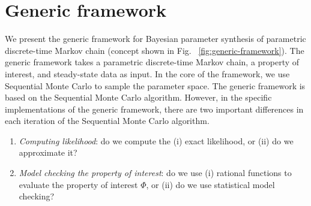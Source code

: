 \section{Generic framework}
We present the generic framework for Bayesian parameter synthesis of parametric discrete-time Markov
chain (concept shown in Fig. ~\ref{fig:generic-framework}). The generic framework takes a
parametric discrete-time Markov chain, a property of interest, and steady-state data as input. In
the core of the framework, we use Sequential Monte Carlo to sample the parameter space. The generic
framework is based on the Sequential Monte Carlo algorithm. However, in the specific implementations
of the generic framework, there are two important differences in each iteration of the Sequential
Monte Carlo algorithm.
\begin{enumerate}
    \item \textit{Computing likelihood}: do we compute the (i) exact likelihood, or (ii) do we
          approximate it?
    \item \textit{Model checking the property of interest}: do we use (i) rational functions to
          evaluate the property of interest $\Phi$, or (ii) do we use statistical model checking?
\end{enumerate}
